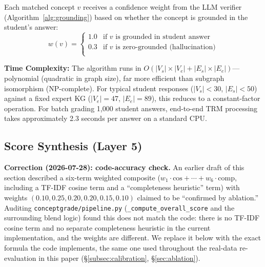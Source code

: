\documentclass[conference]{IEEEtran}
\begin{document}
Each matched concept $v$ receives a confidence weight from the LLM verifier
(Algorithm~\ref{alg:grounding}) based on whether the concept is grounded in
the student's answer:
\begin{equation}
  w(v) =
  \begin{cases}
    1.0 & \text{if } v \text{ is grounded in student answer} \\
    0.3 & \text{if } v \text{ is zero-grounded (hallucination)} \\
  \end{cases}
  \label{eq:verifier_weight}
\end{equation}

\textbf{Time Complexity:} The algorithm runs in $O(|V_s| \times |V_e| + |E_s| \times |E_e|)$—
polynomial (quadratic in graph size), far more efficient than subgraph isomorphism
(NP-complete). For typical student responses ($|V_s| < 30$, $|E_s| < 50$) against
a fixed expert KG ($|V_e| = 47$, $|E_e| = 89$), this reduces to a constant-factor
operation. For batch grading 1,000 student answers, end-to-end TRM processing
takes approximately 2.3 seconds per answer on a standard CPU.

\subsection{Score Synthesis (Layer 5)}
\label{subsec:synthesis}

\textbf{Correction (2026-07-28): code-accuracy check.} An earlier draft
of this section described a six-term weighted composite
($w_1\!\cdot\!\text{cos} + \cdots + w_6\!\cdot\!\text{comp}$, including a
TF-IDF cosine term and a ``completeness heuristic'' term) with weights
$(0.10,0.25,0.20,0.20,0.15,0.10)$ claimed to be ``confirmed by
ablation.'' Auditing \texttt{conceptgrade/pipeline.py}
(\texttt{\_compute\_overall\_score} and the surrounding blend logic)
found this does not match the code: there is no TF-IDF cosine term and
no separate completeness heuristic in the current implementation, and
the weights are different. We replace it below with the exact formula
the code implements, the same one used throughout the real-data
re-evaluation in this paper (\S\ref{subsec:calibration},
\S\ref{sec:ablation}).
\end{document}
